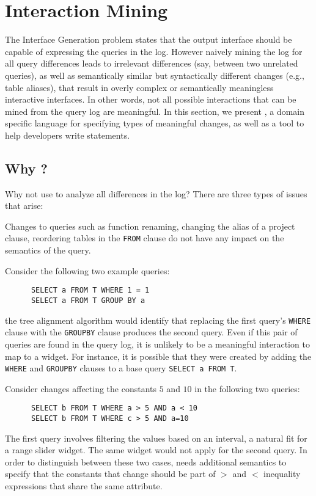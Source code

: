 \section{Interaction Mining}\label{s:pilang}

The Interface Generation problem states that the output interface should be capable of expressing the queries in the log.  However naively mining the log for all query differences leads to irrelevant differences (say, between two unrelated queries), as well as semantically similar but syntactically different changes (e.g., table aliases), that result in overly complex or semantically meaningless interactive interfaces.  In other words, not all possible interactions that can be mined from the query log are meaningful.    In this section, we present \lang, a domain specific language for specifying types of meaningful changes, as well as a tool to help developers write \lang statements.

\subsection{Why \lang?}

Why not use \difftable to analyze all differences in the log?
There are three types of issues that arise:

 Changes to queries such as function renaming, changing the alias of a project clause, reordering tables in the \texttt{FROM} clause do not have any impact on the semantics of the query.

 Consider the following two example queries:
{\small\begin{verbatim}
      SELECT a FROM T WHERE 1 = 1
      SELECT a FROM T GROUP BY a\end{verbatim}}
\noindent the tree alignment algorithm would identify that replacing the first query's \texttt{WHERE} clause with the \texttt{GROUPBY} clause produces the second query.  Even if this pair of queries are found in the query log, it is unlikely to be a meaningful interaction to map to a widget.  For instance, it is possible that they were created by adding the \texttt{WHERE} and \texttt{GROUPBY} clauses to a base query \texttt{SELECT a FROM T}.

 Consider changes affecting the constants $5$ and $10$ in the following two queries:
{\small\begin{verbatim}
      SELECT b FROM T WHERE a > 5 AND a < 10
      SELECT b FROM T WHERE c > 5 AND a=10 \end{verbatim}
}
The first query involves filtering the values based on an interval, a natural fit for a range slider widget. The same widget would not apply for the second query. In order to distinguish between these two cases, \sys needs additional semantics to specify that the constants that change should be part of $>$ and $<$ inequality expressions that share the same attribute.


